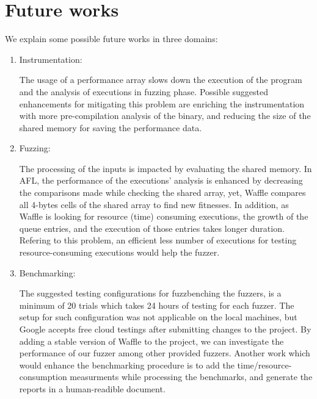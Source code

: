 \section{Future works}
\label{sec:future-work}

We explain some possible future works in three domains:

\begin{enumerate}
    \item Instrumentation:

        The usage of a performance array slows down the execution of the program and the analysis of executions in fuzzing phase. Possible suggested enhancements for mitigating this problem are enriching the instrumentation with more pre-compilation analysis of the binary, and reducing the size of the shared memory for saving the performance data.
        
    \item Fuzzing:
    
        The processing of the inputs is impacted by evaluating the shared memory. In AFL, the performance of the executions' analysis is enhanced by decreasing the comparisons made while checking the shared array, yet, Waffle compares all 4-bytes cells of the shared array to find new fitnesses. In addition, as Waffle is looking for resource (time) consuming executions, the growth of the queue entries, and the execution of those entries takes longer duration. Refering to this problem, an efficient less number of executions for testing resource-consuming executions would help the fuzzer. 

    \item Benchmarking:
        
        The suggested testing configurations for fuzzbenching the fuzzers, is a minimum of 20 trials which takes 24 hours of testing for each fuzzer. The setup for such configuration was not applicable on the local machines, but Google accepts free cloud testings after submitting changes to the project. By adding a stable version of Waffle to the project, we can investigate the performance of our fuzzer among other provided fuzzers. Another work which would enhance the benchmarking procedure is to add the time/resource-consumption measurments while processing the benchmarks, and generate the reports in a human-readible document.
\end{enumerate}